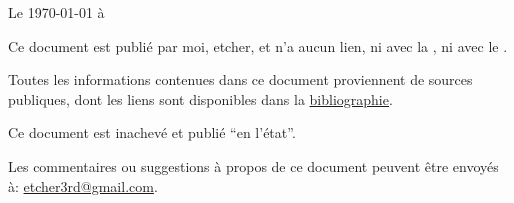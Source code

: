 \thispagestyle{empty}

%


\vfil

\begin{flushright}Le \today{} à \currenttime{}\end{flushright}%

\vfil%

\vfil%



%
%
%
%
%
%
%
%
%

Ce document est publié par moi, etcher, et n'a aucun lien, ni avec la \thirdwing{}, ni avec le \rgt{} \inmem{}.

\vfil

Toutes les informations contenues dans ce document proviennent de sources publiques, dont les liens sont disponibles dans la \hyperref[ann_biblio]{bibliographie}.

\vfil%

Ce document est inachevé et publié ``en l'état''.

\vfil%

Les commentaires ou suggestions à propos de ce document peuvent être envoyés à: \href{mailto:etcher3rd@gmail.com}{etcher3rd@gmail.com}.

